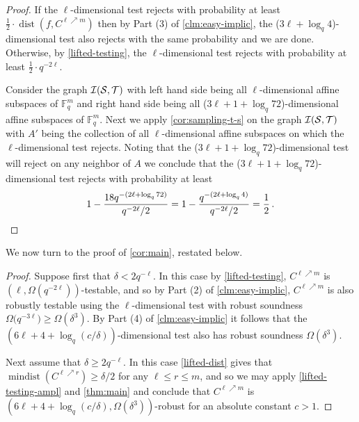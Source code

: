 \documentclass{toc}
\theoremstyle{plain}
\DeclareMathOperator{\dist}{dist} %
\DeclareMathOperator{\mindist}{mindist}  %
\newcommand{\F}{{\mathbb{F}}}
\newcommand{\calI}{{\mathcal{I}}}
\begin{document}

\begin{proof}
If the $\ell$-dimensional test rejects with probability at least $\frac 1 2 \cdot \dist(f, C^{\ell \nearrow m})$ then by Part (3) of \cref{clm:easy-implic}, the ($3\ell+\log_q4$)-dimensional test also rejects with the same probability and we are done. Otherwise, by \cref{lifted-testing}, the $\ell$-dimensional test rejects with probability at least $\frac 1 2 \cdot q^{-2\ell}$.

%
Consider the  graph $\calI( \cal S, \cal T)$ with left hand side being all $\ell$-dimensional affine subspaces of $\F_q^m$ and right hand side being all ($3\ell+1+\log_q 72$)-dimensional affine subspaces of $\F_q^m$. Next we apply \cref{cor:sampling-t-s} on the graph $\calI (\cal S, \cal T)$ with
$A'$ being the collection of all $\ell$-dimensional affine subspaces on which the $\ell$-dimensional test rejects.
Noting that the ($3\ell+1+\log_q72$)-dimensional test will reject on any neighbor of $A$ we conclude that the ($3\ell+1+\log_q72$)-dimensional test rejects with probability at least
\[1 - \frac{18q^{-(2\ell+\log_q72)}} {q^{-2\ell} /2 }=1 -
\frac{q^{-(2\ell+\log_q4)}} {q^{-2\ell} /2 } = \frac{1} {2}\,. \qedhere\]
\end{proof}

We now turn to the proof of \cref{cor:main}, restated below.

\maincor*

%
%
%
%
%
%
%

\begin{proof}
Suppose first that $\delta < 2q^{-\ell}$.
In this case by \cref{lifted-testing}, $C^{\ell \nearrow m}$ is $(\ell,\Omega(q^{-2\ell}))$-testable, and so by Part (2) of
\cref{clm:easy-implic},
 $C^{\ell \nearrow m}$ is also robustly testable using the $\ell$-dimensional test with robust soundness $\Omega\big(q^{-3\ell}\big) \geq \Omega(\delta^3)$. By Part (4) of \cref{clm:easy-implic}
it follows that the $(6\ell +4+\log_q(c/\delta))$-dimensional test also has robust soundness $\Omega(\delta^3)$.

Next assume that $\delta \geq 2q^{-\ell}$. In this case \cref{lifted-dist} gives that $\mindist(C^{\ell \nearrow r})\geq \delta/2$ for any $\ell \leq r \leq m$, and so we may apply \cref{lifted-testing-ampl} and
 \cref{thm:main} and conclude that  $C^{\ell \nearrow m}$ is $(6\ell+4+\log_q(c/\delta),  \Omega( \delta^3))$-robust for an absolute constant $c >1$.
\end{proof}
\end{document}
